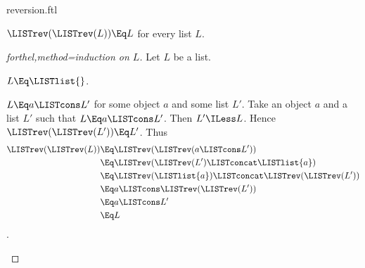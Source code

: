 \documentclass{stex}
\begin{document}
\begin{smodule}{reversion.ftl}
\begin{proposition}[forthel]
  $\LISTrev(\LISTrev(L)) \Eq L$ for every list $L$.
\end{proposition}
\begin{proof}[forthel,method=induction on $L$]
  Let $L$ be a list.

  \begin{case}{$L \Eq \LISTlist{}$.}\end{case}

  \begin{case}{$L \Eq a \LISTcons L'$ for some object $a$ and some list $L'$.}
    Take an object $a$ and a list $L'$ such that $L \Eq a \LISTcons L'$.
    Then $L' \ILess L$.
    Hence $\LISTrev(\LISTrev(L')) \Eq L'$.
    Thus
    \begin{align*}
      \LISTrev(\LISTrev(L))
        &\Eq \LISTrev(\LISTrev(a \LISTcons L'))\\
        &\Eq \LISTrev(\LISTrev(L') \LISTconcat \LISTlist{a})\\
        &\Eq \LISTrev(\LISTlist{a}) \LISTconcat \LISTrev(\LISTrev(L'))\\
        &\Eq a \LISTcons \LISTrev(\LISTrev(L'))\\
        &\Eq a \LISTcons L'\\
        &\Eq L
    \end{align*}.
  \end{case}
\end{proof}
\end{smodule}
\end{document}

